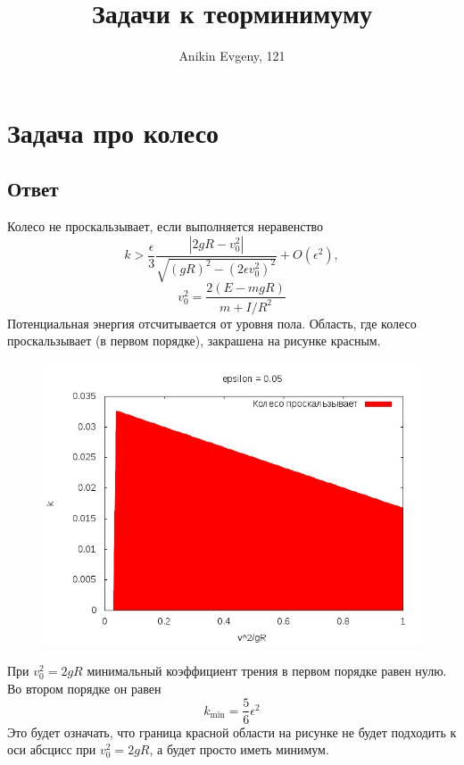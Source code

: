 \documentclass{article}
\title{Задачи к теорминимуму}
\author{Anikin Evgeny, 121}
\begin{document}
\maketitle
	\section{Задача про колесо}
	\subsection{Ответ}
	Колесо не проскальзывает, если выполняется неравенство
	\begin{equation}
		k > \frac{\epsilon}{3} 
			\frac{|2gR - v_0^2|}{\sqrt{(gR)^2 - (2\epsilon v_0^2)^2}} + O(\epsilon^2),
	\end{equation}
	\begin{equation}
		v_0^2 = \frac{2(E - mgR)}{m + I/R^2}
	\end{equation}	
	Потенциальная энергия отсчитывается от уровня пола.
	Область, где колесо проскальзывает (в первом порядке), закрашена на рисунке красным.
	\begin{figure}[ht]
		\includegraphics[width=\linewidth]{wheel.jpg}
	\end{figure}
	При $v_0^2 = 2gR$ минимальный коэффициент трения в первом порядке равен нулю.
	Во втором порядке он равен
	\begin{equation}
		k_{\mathrm{min}} = \frac{5}{6}\epsilon^2
	\end{equation}
	Это будет означать, что граница красной области на рисунке не будет подходить к оси абсцисс
	при $v_0^2 = 2gR$, а будет просто иметь минимум.
\end{document}
